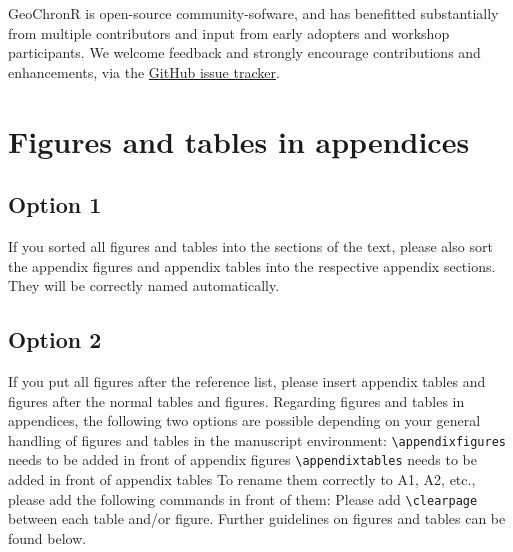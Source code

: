 \documentclass[gchron, manuscript]{copernicus}
\begin{document}
GeoChronR is open-source community-sofware, and has benefitted substantially from multiple contributors and input from early adopters and workshop participants.
We welcome feedback and strongly encourage contributions and enhancements, via the \href{https://github.com/nickmckay/GeoChronR/issues}{GitHub issue tracker}.








\appendix
\section{Figures and tables in appendices}
\subsection{Option 1}

If you sorted all figures and tables into the sections of the text, please also sort the appendix figures and appendix tables into the respective appendix sections.
They will be correctly named automatically.

\subsection{Option 2}

If you put all figures after the reference list, please insert appendix tables and figures after the normal tables and figures.
Regarding figures and tables in appendices, the following two options are possible depending on your general handling of figures and tables in the manuscript environment:
\texttt{\textbackslash{}appendixfigures} needs to be added in front of appendix figures
\texttt{\textbackslash{}appendixtables} needs to be added in front of appendix tables
To rename them correctly to A1, A2, etc., please add the following commands in front of them:
Please add \texttt{\textbackslash{}clearpage} between each table and/or figure. Further guidelines on figures and tables can be found below.
\noappendix


\end{document}
